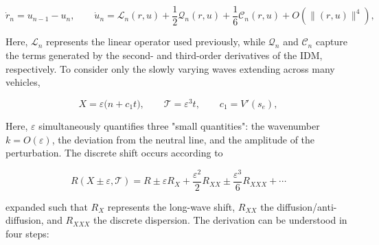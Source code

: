 \documentclass[11pt,a4paper,openany]{book}
\numberwithin{equation}{chapter}
\numberwithin{figure}{chapter}
\numberwithin{table}{chapter}
\begin{document}
\begin{equation}
\dot r_n=u_{n-1}-u_n,
\qquad
\dot u_n=\mathcal L_n(r,u)+\frac12\mathcal Q_n(r,u)+\frac16\mathcal C_n(r,u)+O(\|(r,u)\|^4),
\label{eq:nonlinear-taylor}
\end{equation}

Here, $\mathcal L_n$ represents the linear operator used previously, while $\mathcal Q_n$ and $\mathcal C_n$ capture the terms generated by the second- and third-order derivatives of the IDM, respectively. To consider only the slowly varying waves extending across many vehicles,

\begin{equation}
X=\varepsilon\bigl(n+c_1t\bigr),
\qquad
\mathcal T=\varepsilon^3t,
\qquad
c_1=V'(s_e),
\label{eq:slow-scales}
\end{equation}

Here, $\varepsilon$ simultaneously quantifies three "small quantities": the wavenumber $k=O(\varepsilon)$, the deviation from the neutral line, and the amplitude of the perturbation. The discrete shift occurs according to

\begin{equation}
R(X\pm\varepsilon,\mathcal T)
=R\pm\varepsilon R_X+\frac{\varepsilon^2}{2}R_{XX}
\pm\frac{\varepsilon^3}{6}R_{XXX}+\cdots
\label{eq:nonlinear-shift-expansion}
\end{equation}

expanded such that $R_X$ represents the long-wave shift, $R_{XX}$ the diffusion/anti-diffusion, and $R_{XXX}$ the discrete dispersion. The derivation can be understood in four steps:
\end{document}
